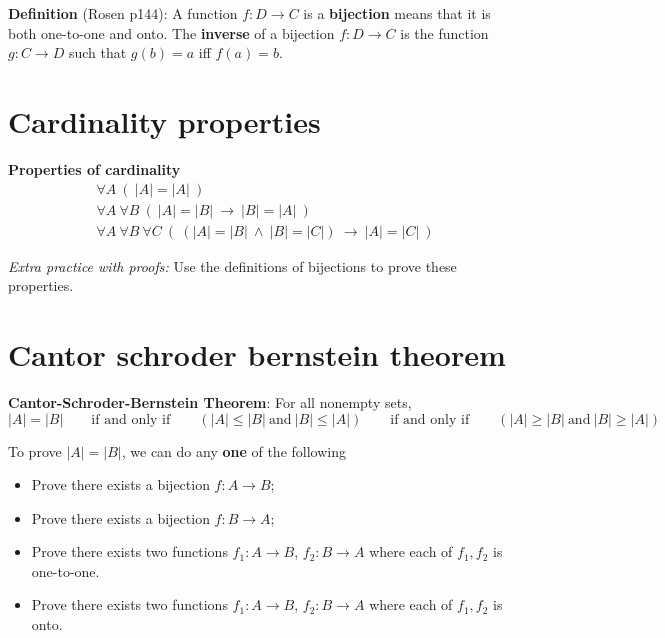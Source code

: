 \documentclass[12pt, oneside]{article}
\begin{document}
{\bf Definition}  (Rosen p144): A function $f: D  \to C$ is a {\bf bijection} means that it is both  one-to-one  and onto.
The {\bf inverse} of a  bijection $f: D  \to  C$ is  the function $g: C  \to  D$  such that $g(b) = a$ iff  $f(a) =  b$.


 \vfill
\section*{Cardinality properties}


{\bf Properties of cardinality}
\begin{align*}
&\forall A ~ (~  |A| = |A| ~)\\
&\forall A ~ \forall B ~(~ |A| = |B|  ~\to ~ |B| = |A|~)\\
&\forall A ~ \forall B ~ \forall C~ (~ (|A| = |B| ~\wedge~ |B| = |C|) ~\to ~ |A| = |C|~)
\end{align*}

{\it Extra practice with proofs:} Use the definitions of bijections to prove these properties. \vfill
\section*{Cantor schroder bernstein theorem}


{\bf Cantor-Schroder-Bernstein Theorem}: For all nonempty sets,
\[
|A| = |B| \qquad\text{if and only if} \qquad (|A| \leq |B| ~\text{and}~ |B| \leq |A|)
\qquad\text{if and only if} \qquad (|A| \geq |B| ~\text{and}~ |B| \geq |A|)
\]

To prove $|A| = |B|$,  we can do any {\bf one} of the following

\begin{itemize}\setlength{\itemsep}{-5pt}
\item Prove there exists  a bijection $f:  A \to B$;
\item Prove there exists a  bijection  $f: B  \to  A$;
\item Prove there exists two functions $f_1: A \to B$, $f_2: B \to  A$ where each of $f_1, f_2$ is one-to-one.
\item Prove there exists two functions $f_1: A \to B$, $f_2: B \to  A$ where each of $f_1, f_2$ is onto.
\end{itemize} \vfill
\end{document}
